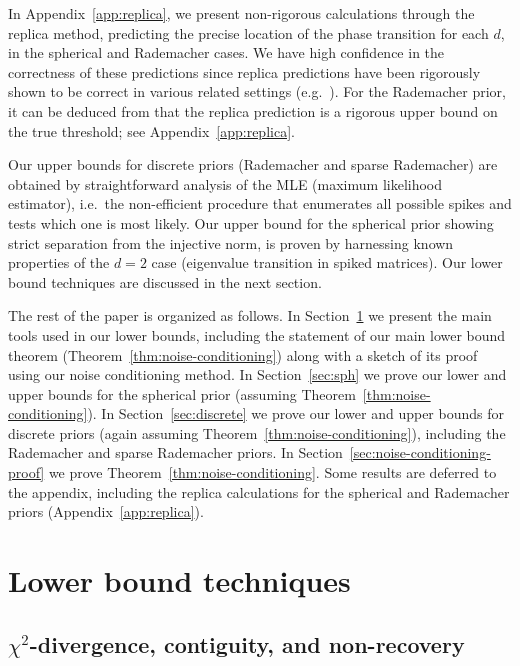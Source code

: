\documentclass{article}
\begin{document}
In Appendix~\ref{app:replica}, we present non-rigorous calculations through the replica method, predicting the precise location of the phase transition for each $d$, in the spherical and Rademacher cases. We have high confidence in the correctness of these predictions since replica predictions have been rigorously shown to be correct in various related settings (e.g.\ \cite{tal06parisi,tal06,mi,mi-proof,lelarge-limits-lowrank}). For the Rademacher prior, it can be deduced from \cite{km} that the replica prediction is a rigorous upper bound on the true threshold; see Appendix~\ref{app:replica}.

Our upper bounds for discrete priors (Rademacher and sparse Rademacher) are obtained by straightforward analysis of the MLE (maximum likelihood estimator), i.e.\ the non-efficient procedure that enumerates all possible spikes and tests which one is most likely. Our upper bound for the spherical prior showing strict separation from the injective norm, is proven by harnessing known properties of the $d = 2$ case (eigenvalue transition in spiked matrices). Our lower bound techniques are discussed in the next section.

The rest of the paper is organized as follows. In Section~\ref{sec:bounds} we present the main tools used in our lower bounds, including the statement of our main lower bound theorem (Theorem~\ref{thm:noise-conditioning}) along with a sketch of its proof using our noise conditioning method. In Section~\ref{sec:sph} we prove our lower and upper bounds for the spherical prior (assuming Theorem~\ref{thm:noise-conditioning}). In Section~\ref{sec:discrete} we prove our lower and upper bounds for discrete priors (again assuming Theorem~\ref{thm:noise-conditioning}), including the Rademacher and sparse Rademacher priors. In Section~\ref{sec:noise-conditioning-proof} we prove Theorem~\ref{thm:noise-conditioning}. Some results are deferred to the appendix, including the replica calculations for the spherical and Rademacher priors (Appendix~\ref{app:replica}).








\section{Lower bound techniques}\label{sec:bounds}

\subsection{$\chi^2$-divergence, contiguity, and non-recovery}
\label{sec:contig}
\end{document}
